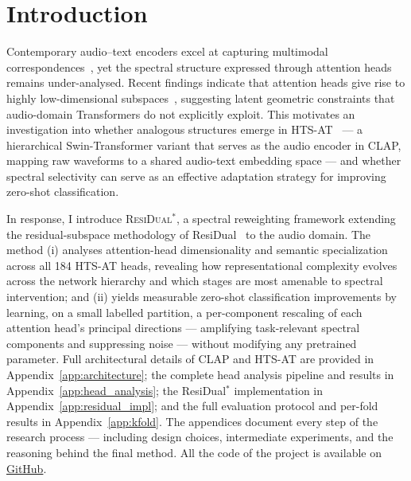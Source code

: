 \section{Introduction}

Contemporary audio–text encoders excel at capturing multimodal 
correspondences~\cite{musicaudiolanguage, msclap}, yet the spectral structure 
expressed through attention heads remains under-analysed. 
Recent findings indicate that attention heads give rise to highly low-dimensional
subspaces~\cite{low-dimensionalresidual2025, residual2024}, suggesting 
latent geometric constraints that audio-domain Transformers do not explicitly exploit. 
This motivates an investigation into whether analogous structures emerge in 
HTS-AT~\cite{htsat} — a hierarchical Swin-Transformer variant that serves as 
the audio encoder in CLAP, mapping raw waveforms to a shared 
audio-text embedding space — and whether spectral selectivity can serve as an 
effective adaptation strategy for improving zero-shot classification.

In response, I introduce \textsc{ResiDual$^*$}, a spectral reweighting framework 
extending the residual-subspace methodology of ResiDual~\cite{residual2024}
to the audio domain. The method (i) analyses attention-head dimensionality and semantic specialization 
across all 184 HTS-AT heads, revealing how representational complexity evolves 
across the network hierarchy and which stages are most amenable to spectral 
intervention; and (ii) yields measurable zero-shot classification improvements 
by learning, on a small labelled partition, a per-component rescaling of each 
attention head's principal directions — amplifying task-relevant spectral components 
and suppressing noise — without modifying any pretrained parameter. 
Full architectural details of CLAP and HTS-AT are provided in 
Appendix~\ref{app:architecture}; the complete head analysis pipeline and results 
in Appendix~\ref{app:head_analysis}; the ResiDual$^*$ implementation in 
Appendix~\ref{app:residual_impl}; and the full evaluation protocol and per-fold 
results in Appendix~\ref{app:kfold}. 
The appendices document every step of the research process — including design choices, 
intermediate experiments, and the reasoning behind the final method. All the code of the project 
is available on \href{https://github.com/lorenzo-arcioni/ResiDual-CLAP}{GitHub}.
